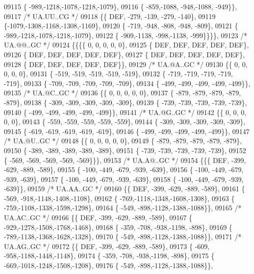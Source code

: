 \begin{DoxyCode}
09115 \{ -989,-1218,-1078,-1218,-1079\},
09116 \{ -859,-1088, -948,-1088, -949\}\},
09117 \textcolor{comment}{/* UA.UU..CG */}
09118 \{\{  DEF, -279, -139, -279, -140\},
09119 \{-1079,-1308,-1168,-1308,-1169\},
09120 \{ -719, -948, -808, -948, -809\},
09121 \{ -989,-1218,-1078,-1218,-1079\},
09122 \{ -909,-1138, -998,-1138, -999\}\}\}\},
09123 \textcolor{comment}{/* UA.@@..GC */}
09124 \{\{\{\{    0,    0,    0,    0,    0\},
09125 \{  DEF,  DEF,  DEF,  DEF,  DEF\},
09126 \{  DEF,  DEF,  DEF,  DEF,  DEF\},
09127 \{  DEF,  DEF,  DEF,  DEF,  DEF\},
09128 \{  DEF,  DEF,  DEF,  DEF,  DEF\}\},
09129 \textcolor{comment}{/* UA.@A..GC */}
09130 \{\{    0,    0,    0,    0,    0\},
09131 \{ -519, -519, -519, -519, -519\},
09132 \{ -719, -719, -719, -719, -719\},
09133 \{ -709, -709, -709, -709, -709\},
09134 \{ -499, -499, -499, -499, -499\}\},
09135 \textcolor{comment}{/* UA.@C..GC */}
09136 \{\{    0,    0,    0,    0,    0\},
09137 \{ -879, -879, -879, -879, -879\},
09138 \{ -309, -309, -309, -309, -309\},
09139 \{ -739, -739, -739, -739, -739\},
09140 \{ -499, -499, -499, -499, -499\}\},
09141 \textcolor{comment}{/* UA.@G..GC */}
09142 \{\{    0,    0,    0,    0,    0\},
09143 \{ -559, -559, -559, -559, -559\},
09144 \{ -309, -309, -309, -309, -309\},
09145 \{ -619, -619, -619, -619, -619\},
09146 \{ -499, -499, -499, -499, -499\}\},
09147 \textcolor{comment}{/* UA.@U..GC */}
09148 \{\{    0,    0,    0,    0,    0\},
09149 \{ -879, -879, -879, -879, -879\},
09150 \{ -389, -389, -389, -389, -389\},
09151 \{ -739, -739, -739, -739, -739\},
09152 \{ -569, -569, -569, -569, -569\}\}\},
09153 \textcolor{comment}{/* UA.A@..GC */}
09154 \{\{\{  DEF, -399, -629, -889, -589\},
09155 \{ -100, -449, -679, -939, -639\},
09156 \{ -100, -449, -679, -939, -639\},
09157 \{ -100, -449, -679, -939, -639\},
09158 \{ -100, -449, -679, -939, -639\}\},
09159 \textcolor{comment}{/* UA.AA..GC */}
09160 \{\{  DEF, -399, -629, -889, -589\},
09161 \{ -569, -918,-1148,-1408,-1108\},
09162 \{ -769,-1118,-1348,-1608,-1308\},
09163 \{ -759,-1108,-1338,-1598,-1298\},
09164 \{ -549, -898,-1128,-1388,-1088\}\},
09165 \textcolor{comment}{/* UA.AC..GC */}
09166 \{\{  DEF, -399, -629, -889, -589\},
09167 \{ -929,-1278,-1508,-1768,-1468\},
09168 \{ -359, -708, -938,-1198, -898\},
09169 \{ -789,-1138,-1368,-1628,-1328\},
09170 \{ -549, -898,-1128,-1388,-1088\}\},
09171 \textcolor{comment}{/* UA.AG..GC */}
09172 \{\{  DEF, -399, -629, -889, -589\},
09173 \{ -609, -958,-1188,-1448,-1148\},
09174 \{ -359, -708, -938,-1198, -898\},
09175 \{ -669,-1018,-1248,-1508,-1208\},
09176 \{ -549, -898,-1128,-1388,-1088\}\},

\end{DoxyCode}
